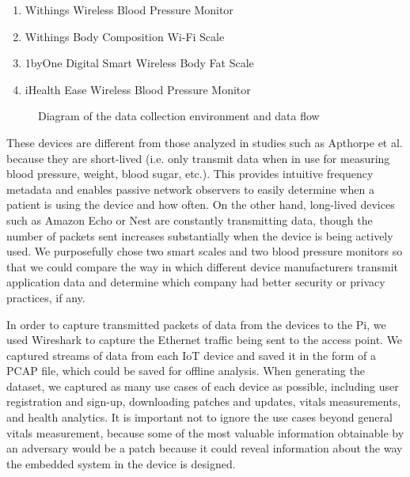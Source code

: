 \begin{enumerate}
  \item Withings Wireless Blood Pressure Monitor
  \item Withings Body Composition Wi-Fi Scale
  \item 1byOne Digital Smart Wireless Body Fat Scale
  \item iHealth Ease Wireless Blood Pressure Monitor
\end{enumerate}

\begin{figure}
  \caption{Diagram of the data collection environment and data flow}
  \centering
\end{figure}

These devices are different from those analyzed in studies such as Apthorpe et al. because they are short-lived (i.e. only transmit data when in use for measuring blood pressure, weight, blood sugar, etc.). This provides intuitive frequency metadata and enables passive network observers to easily determine when a patient is using the device and how often. On the other hand, long-lived devices such as Amazon Echo or Nest are constantly transmitting data, though the number of packets sent increases substantially when the device is being actively used. We purposefully chose two smart scales and two blood pressure monitors so that we could compare the way in which different device manufacturers transmit application data and determine which company had better security or privacy practices, if any. 

In order to capture transmitted packets of data from the devices to the Pi, we used Wireshark to capture the Ethernet traffic being sent to the access point. We captured streams of data from each IoT device and saved it in the form of a PCAP file, which could be saved for offline analysis. When generating the dataset, we captured as many use cases of each device as possible, including user registration and sign-up, downloading patches and updates, vitals measurements, and health analytics. It is important not to ignore the use cases beyond general vitals measurement, because some of the most valuable information obtainable by an adversary would be a patch because it could reveal information about the way the embedded system in the device is designed. 

